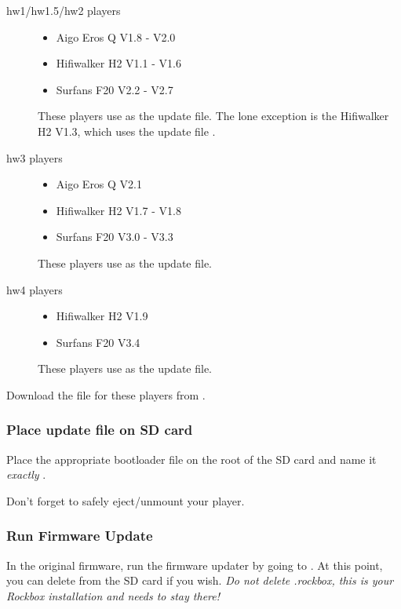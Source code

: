 \begin{description}
\item[hw1/hw1.5/hw2 players]
  \begin{itemize}
    \item Aigo Eros Q V1.8 - V2.0
    \item Hifiwalker H2 V1.1 - V1.6
    \item Surfans F20 V2.2 - V2.7
  \end{itemize}
  These players use  as the update file.
  The lone exception is the Hifiwalker H2 V1.3, which uses the update file
  .
\item[hw3 players]
  \begin{itemize}
    \item Aigo Eros Q V2.1
    \item Hifiwalker H2 V1.7 - V1.8
    \item Surfans F20 V3.0 - V3.3
  \end{itemize}
  These players use  as the update file.
\item[hw4 players]
  \begin{itemize}
    \item Hifiwalker H2 V1.9
    \item Surfans F20 V3.4
  \end{itemize}
  These players use  as the update file.
\end{description}

Download the  file for these players from .


\subsubsection{Place update file on SD card}\label{ref:place_on_sd_card}
Place the appropriate bootloader file on the root of the SD card and name it
\emph{exactly} .


Don't forget to safely eject/unmount your player.

\subsubsection{Run Firmware Update}\label{ref:run_firmware_update}
In the original firmware, run the firmware updater by going to
. At this point, you can delete
 from the SD card if you wish. \emph{Do not delete .rockbox,
this is your Rockbox installation and needs to stay there!}
